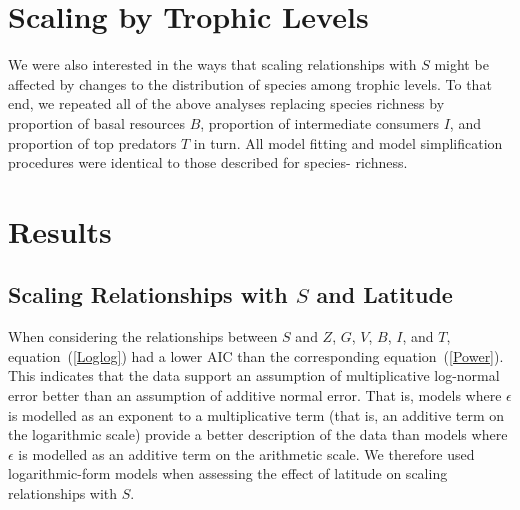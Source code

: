\documentclass[12pt]{article}
\begin{document}


\section*{Scaling by Trophic Levels}

  We were also interested in the ways that scaling relationships with $S$ might
  be affected by changes to the distribution of species among trophic levels. To
  that end, we repeated all of the above analyses replacing species richness by
  proportion of basal resources $B$, proportion of intermediate consumers $I$,
  and  proportion of top predators $T$ in turn. All model fitting and model
  simplification procedures were identical to those described for species-
  richness.



\section*{Results}

\subsection*{Scaling Relationships with $S$ and Latitude}

  When considering the relationships between $S$ and $Z$, $G$, $V$, $B$, $I$, and $T$,
  equation~(\ref{Loglog}) had a
  lower AIC than the corresponding equation~(\ref{Power}). This indicates that the
  data support an assumption of multiplicative log-normal error better than an
  assumption of additive normal error. That is, models where $\epsilon$ is
  modelled as an exponent to a multiplicative term (that is, an additive term on
  the logarithmic scale) provide a better description of the data than models
  where $\epsilon$ is modelled as an additive term on the arithmetic scale.  
  We therefore used logarithmic-form models when assessing the
  effect of latitude on scaling relationships  with $S$.
\end{document}
